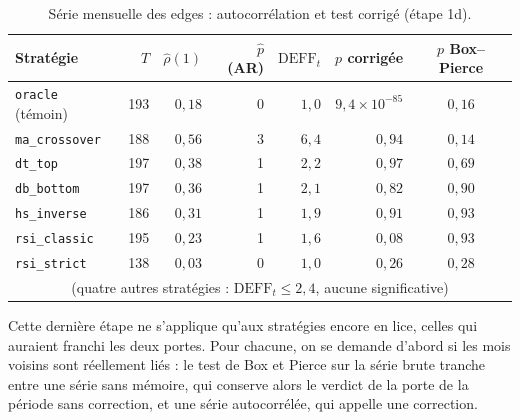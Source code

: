\begin{table}[H]
\centering
\caption{Série mensuelle des edges : autocorrélation et test corrigé (étape 1d).}
\label{tab:b1-dep-mensuel}
\small
\begin{tabular}{@{}lrrrrrc@{}}
\toprule
Stratégie & $T$ & $\hat\rho(1)$ & $\hat p$ (AR) & $\mathrm{DEFF}_t$ & $p$ corrigée & $p$ Box--Pierce \\
\midrule
\texttt{oracle} (témoin) & 193 & $0{,}18$ & 0 & $1{,}0$ & $9{,}4\times10^{-85}$ & $0{,}16$ \\
\midrule
\texttt{ma\_crossover} & 188 & $0{,}56$ & 3 & $6{,}4$ & $0{,}94$ & $0{,}14$ \\
\texttt{dt\_top}       & 197 & $0{,}38$ & 1 & $2{,}2$ & $0{,}97$ & $0{,}69$ \\
\texttt{db\_bottom}    & 197 & $0{,}36$ & 1 & $2{,}1$ & $0{,}82$ & $0{,}90$ \\
\texttt{hs\_inverse}   & 186 & $0{,}31$ & 1 & $1{,}9$ & $0{,}91$ & $0{,}93$ \\
\texttt{rsi\_classic}  & 195 & $0{,}23$ & 1 & $1{,}6$ & $0{,}08$ & $0{,}93$ \\
\texttt{rsi\_strict}   & 138 & $0{,}03$ & 0 & $1{,}0$ & $0{,}26$ & $0{,}28$ \\
\multicolumn{7}{c}{\footnotesize (quatre autres stratégies : $\mathrm{DEFF}_t \le 2{,}4$, aucune significative)} \\
\bottomrule
\end{tabular}
\end{table}



Cette dernière étape ne s'applique qu'aux stratégies encore en lice, celles
qui auraient franchi les deux portes. Pour chacune, on se demande d'abord si
les mois voisins sont réellement liés : le test de Box et Pierce sur la série
brute tranche entre une série sans mémoire, qui conserve alors le verdict de
la porte de la période sans correction, et une série autocorrélée, qui appelle
une correction.

